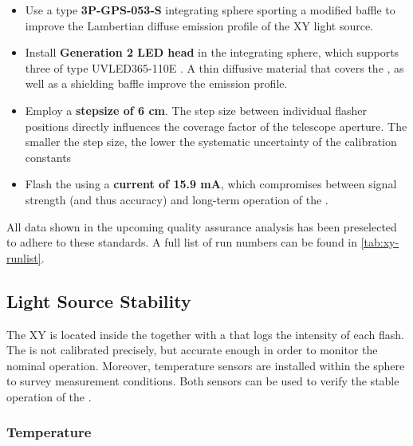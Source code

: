 \vspace{0.4cm}
\begin{itemize}
\item Use a type \textbf{3P-GPS-053-S} integrating sphere sporting a modified 
baffle to improve the Lambertian diffuse emission profile of the XY light 
source.

\item Install \textbf{Generation 2 LED head} in the integrating sphere, which 
supports three \LEDs of type UVLED365-110E 
\cite{alldatasheet.comUVLED365110EDownload}. A thin diffusive material that 
covers the \LEDs, as well as a shielding baffle improve the emission profile.

\item Employ a \textbf{stepsize of 6 cm}. The step size between individual 
flasher positions directly influences the coverage factor of the telescope 
aperture. The smaller the step size, the lower the systematic uncertainty of the
calibration constants

\item Flash the \LED using a \textbf{current of 15.9 mA}, which compromises 
between \FD signal strength (and thus accuracy) and long-term operation of the 
\LED.

\end{itemize}
\vspace{0.4cm}

All data shown in the upcoming quality assurance analysis has been preselected
to adhere to these standards. A full list of run numbers can be found in
\cref{tab:xy-runlist}. 

\subsection{Light Source Stability}

The XY \LED is located inside the \CLS together with a \PD that logs the 
intensity of each \LED flash. The \PD is not calibrated precisely, but accurate
enough in order to monitor the nominal \LED operation. Moreover, temperature 
sensors are installed within the sphere to survey measurement conditions. Both 
sensors can be used to verify the stable operation of the \CLS \LED.



\subsubsection{Temperature}
\label{sssec:xy-qa-temperature}

